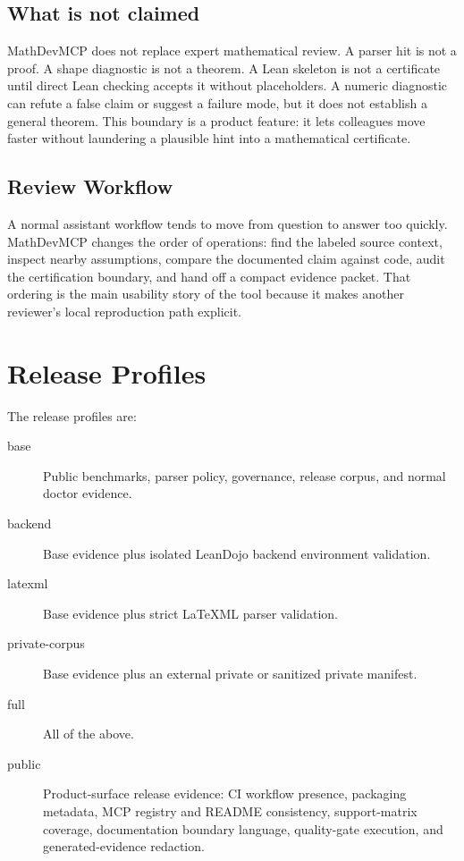 \documentclass[12pt,a4paper,openany]{book}
\begin{document}
\section{What is not claimed}

MathDevMCP does not replace expert mathematical review. A parser hit is not a
proof. A shape diagnostic is not a theorem. A Lean skeleton is not a certificate
until direct Lean checking accepts it without placeholders. A numeric diagnostic
can refute a false claim or suggest a failure mode, but it does not establish a
general theorem. This boundary is a product feature: it lets colleagues move
faster without laundering a plausible hint into a mathematical certificate.

\section{Review Workflow}

A normal assistant workflow tends to move from question to answer too quickly.
MathDevMCP changes the order of operations: find the labeled source context,
inspect nearby assumptions, compare the documented claim against code, audit the
certification boundary, and hand off a compact evidence packet. That ordering is
the main usability story of the tool because it makes another reviewer's local
reproduction path explicit.

\chapter{Release Profiles}

The release profiles are:

\begin{description}
  \item[base] Public benchmarks, parser policy, governance, release corpus, and
    normal doctor evidence.
  \item[backend] Base evidence plus isolated LeanDojo backend environment
    validation.
  \item[latexml] Base evidence plus strict LaTeXML parser validation.
  \item[private-corpus] Base evidence plus an external private or sanitized
    private manifest.
  \item[full] All of the above.
  \item[public] Product-surface release evidence: CI workflow presence,
    packaging metadata, MCP registry and README consistency, support-matrix
    coverage, documentation boundary language, quality-gate execution, and
    generated-evidence redaction.
\end{description}
\end{document}
